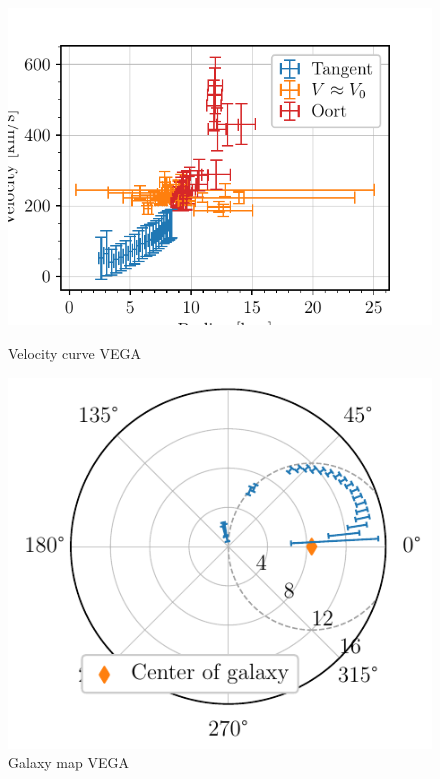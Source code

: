 \begin{figure}[htbp]
    \begin{minipage}[t]{0.5\textwidth}
        \centering
        \captionsetup{width=.9\textwidth}
        \includegraphics[scale=1]{figures/VEGA2_velocity_curve.pdf}
        \caption{Velocity curve VEGA}
        \label{fig:VEGA_velocity_curve}
    \end{minipage}
    \begin{minipage}[t]{0.5\textwidth}
        \centering
        \captionsetup{width=.9\textwidth}
        \includegraphics[scale=1]{figures/VEGA_galaxy_map.pdf}
        \caption{Galaxy map VEGA}
        \label{fig:VEGA_galaxy_map}
    \end{minipage}
\end{figure}

